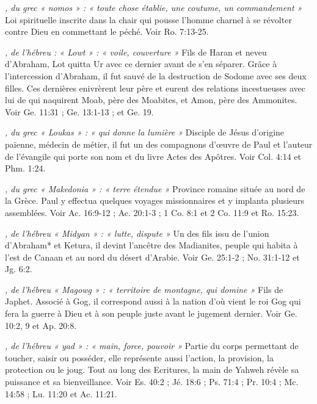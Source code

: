 \begin{multicols}{2}
\textit{, du grec « nomos » : « toute chose établie, une coutume, un commandement »}\newline
Loi spirituelle inscrite dans la chair qui pousse l'homme charnel à se révolter contre Dieu en commettant le péché. Voir Ro. 7:13-25.

\textit{, de l'hébreu : « Lowt » : « voile, couverture »}\newline
Fils de Haran et neveu d'Abraham, Lot quitta Ur avec ce dernier avant de s'en séparer. Grâce à l'intercession d'Abraham, il fut sauvé de la destruction de Sodome avec ses deux filles. Ces dernières enivrèrent leur père et eurent des relations incestueuses avec lui de qui naquirent Moab, père des Moabites, et Amon, père des Ammonites. Voir Ge. 11:31 ; Ge. 13:1-13 ; et Ge. 19.

\textit{, du grec « Loukas » : « qui donne la lumière »}\newline
Disciple de Jésus d'origine païenne, médecin de métier, il fut un des compagnons d'œuvre de Paul et l'auteur de l'évangile qui porte son nom et du livre Actes des Apôtres. Voir Col. 4:14 et Phm. 1:24.

\textit{, du grec « Makedonia » : « terre étendue »}\newline
Province romaine située au nord de la Grèce. Paul y effectua quelques voyages missionnaires et y implanta plusieurs assemblées. Voir Ac. 16:9-12 ; Ac. 20:1-3 ; 1 Co. 8:1 et 2 Co. 11:9 et Ro. 15:23.

\textit{, de l'hébreu « Midyan » : « lutte, dispute »}\newline
Un des fils issu de l'union d'Abraham* et Ketura, il devint l'ancêtre des Madianites, peuple qui habita à l'est de Canaan et au nord du désert d'Arabie. Voir Ge. 25:1-2 ; No. 31:1-12 et Jg. 6:2.

\textit{, de l'hébreu « Magowg » : « territoire de montagne, qui domine »}\newline
Fils de Japhet. Associé à Gog, il correspond aussi à la nation d'où vient le roi Gog qui fera la guerre à Dieu et à son peuple juste avant le jugement dernier. Voir Ge. 10:2, 9 et Ap. 20:8.

\textit{, de l'hébreu « yad » : « main, force, pouvoir »}\newline
Partie du corps permettant de toucher, saisir ou posséder, elle représente aussi l'action, la provision, la protection ou le joug. Tout au long des Ecritures, la main de Yahweh révèle sa puissance et sa bienveillance. Voir Es. 40:2 ; Jé. 18:6 ; Ps. 71:4 ; Pr. 10:4 ; Mc. 14:58 ; Lu. 11:20 et Ac. 11:21.


\end{multicols}
